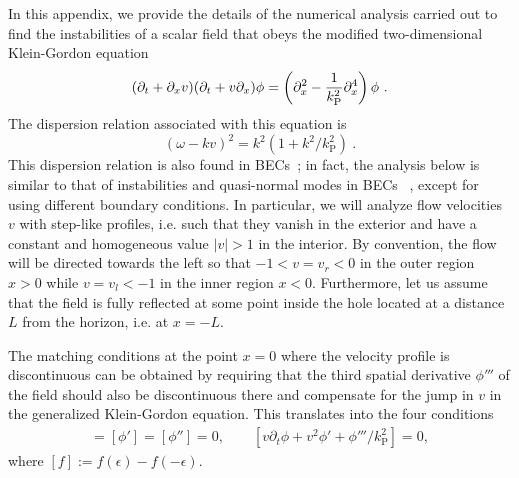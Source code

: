 \documentclass[12pt]{article}
\begin{document}
In this appendix, we provide the details of the numerical analysis carried out to find the instabilities of
a scalar  field  that obeys the modified two-dimensional Klein-Gordon equation
\begin{equation}
(\partial_t +\partial_x v)(\partial_t +v \partial_x) \phi = 
\left(\partial_x^2 - {1 \over k_\text{P}^2} \partial_x^4 \right) \phi~.
\end{equation}
%
The dispersion relation associated with this equation is
%
\begin{equation}
(\omega- k v)^2 = k^2 \left(1+ {k^2 / k_\text{P}^2}\right)~.
\label{eq:disp-append}
\end{equation}
%
This dispersion relation is also found in BECs~\cite{garay-PRL,garay-PRA}; in fact, the analysis below is similar to that of instabilities and quasi-normal modes in BECs ~\cite{cano-barcelo,Barcelo:2007ru}, except for using different boundary conditions. In particular, we will analyze flow velocities $v$ with step-like profiles, i.e. such that they vanish in the exterior and have a constant and homogeneous value $|v|>1$ in the
interior. By convention, the flow will be directed towards the left so that
$-1<v=v_r<0$ in the outer region $x>0$ while $v=v_l<-1$ in the inner region
$x<0$.  Furthermore, let us assume that the field is fully reflected at
some point inside the hole located at a distance $L$ from the horizon, i.e. at
$x=-L$.
 
The matching conditions at the point $x=0$ where the
velocity profile is discontinuous can be obtained by requiring that the third spatial derivative
$\phi'''$ of the field should also be discontinuous there and compensate for the
jump in $v$ in the generalized Klein-Gordon equation. This translates into the four
conditions
\begin{align}
[\phi]=[\phi']=[\phi'']=0,\qquad [v\partial_t \phi+v^2\phi'+\phi'''/k_\text{P}^2]=0,
\label{matching-cond}
\end{align}
where $[f]:=f(\epsilon)-f(-\epsilon)$.
\end{document}

